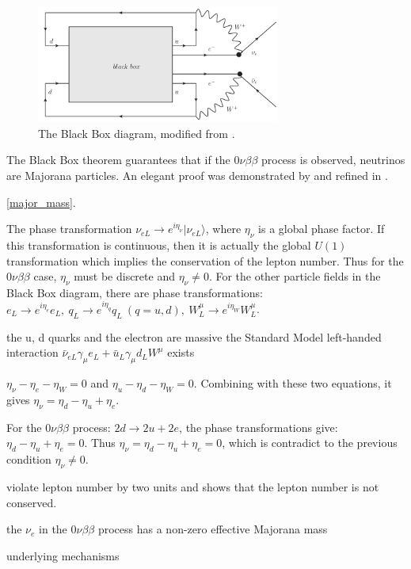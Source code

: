 \begin{figure}[htbp]
	\centering	
	\includegraphics[width=8cm]{blackbox.png}
	\caption{ The Black Box diagram, modified from \cite{schechter1982neutrinoless}.}
	\label{blackbox}
\end{figure}

The Black Box theorem guarantees that if the $0\nu\beta\beta$ process is observed, neutrinos are Majorana particles. An elegant proof was demonstrated by \cite{takasugi1984can} and refined in \cite{duerr2011quantitative,giunti2007fundamentals}. 

\ref{major_mass}.

The phase transformation $\nu_{eL}\to e^{i\eta_{\nu}}|\nu_{eL}\rangle$, where $\eta_\nu$ is a global phase factor.
If this transformation is continuous, then it is actually the global $U(1)$ transformation which implies the conservation of the lepton number. Thus for the $0\nu\beta\beta$ case, $\eta_\nu$ must be discrete and $\eta_\nu\neq 0$. For the other particle fields in the Black Box diagram, there are phase transformations: $e_L\to e^{i\eta_{e}}e_L,~q_L\to e^{i\eta_q}q_L~(q=u,d),~W^\mu_L\to e^{i\eta_W}W_L^\mu$.

the u, d quarks and the electron are massive
the Standard Model left-handed interaction $\bar{\nu}_{eL}\gamma_\mu e_L+\bar{u}_L\gamma_\mu d_L W^\mu$ exists


$\eta_\nu-\eta_e-\eta_W=0$ and $\eta_u-\eta_d-\eta_W=0$.
Combining with these two equations, it gives $\eta_\nu=\eta_d-\eta_u+\eta_e$.


For the $0\nu\beta\beta$ process: $2d\to2u+2e$, the phase transformations give: $\eta_d-\eta_u+\eta_e=0$. Thus $\eta_\nu=\eta_d-\eta_u+\eta_e=0$, which is contradict to the previous condition $\eta_\nu\neq 0$.


violate lepton number by two units and shows that the lepton number is not conserved.

the $\nu_e$ in the $0\nu\beta\beta$ process has a non-zero effective Majorana mass

underlying mechanisms 












